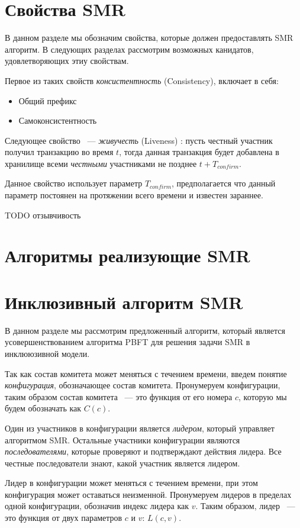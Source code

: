 \section{Свойства SMR}
В данном разделе мы обозначим свойства, которые должен предоставлять SMR алгоритм.
В следующих разделах рассмотрим возможных канидатов, удовлетворяющих этиу свойствам.

Первое из таких свойств \textit{консистентность} (Consistency)\cite{hybrid-consensus}, включает в себя:
\begin{itemize}
\item Общий префикс
\item Самоконсистентность
\end{itemize}

\noindent Следующее свойство ~--- \textit{живучесть} (Liveness) \cite{hybrid-consensus}:
пусть честный участник получил транзакцию во время $t$, тогда данная транзакция будет добавлена в хранилище всеми \textit{честными} участниками не позднее $t + T_{confirm}$.

Данное свойство использует параметр $T_{confirm}$, предполагается что данный параметр постоянен на протяжении всего времени и известен зараннее.

TODO отзывчивость

\section{Алгоритмы реализующие SMR}

\section{Инклюзивный алгоритм SMR}
В данном разделе мы рассмотрим предложенный алгоритм, 
который является усовершенствованием алгоритма PBFT\cite{pbft} для решения задачи SMR в инклююзивной модели.
 
Так как состав комитета может меняться с течением времени, введем понятие \textit{конфигурация}, обозначающее состав комитета. Пронумеруем конфигурации, таким образом состав комитета ~--- это функция от его номера $c$, которую мы будем обозначать как $C(c)$. 
 
Один из участников в конфигурации является \textit{лидером}, который управляет алгоритмом SMR. 
Остальные участники конфигурации являются \textit{последователями}, которые проверяют и подтверждают действия лидера. Все честные последователи знают, какой участник является лидером.

Лидер в конфигурации может меняться с течением времени, при этом конфигурация может оставаться неизменной. Пронумеруем лидеров в пределах одной конфигурации, обозначив индекс лидера как $v$. Таким образом, лидер ~--- это функция от двух параметров $c$ и $v$: $L(c, v)$.

